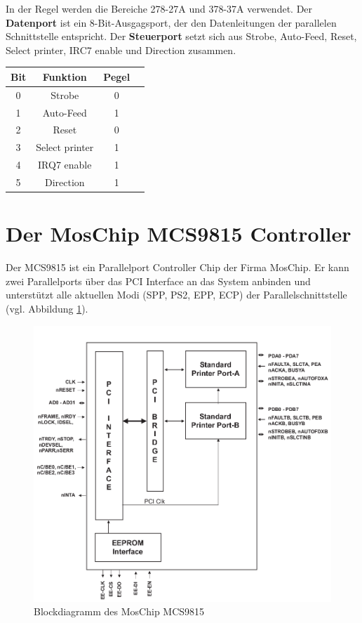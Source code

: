 \documentclass[a4paper,11pt]{article}
\begin{document}
In der Regel werden die Bereiche 278-27A und 378-37A verwendet. Der \textbf{Datenport} ist ein 8-Bit-Ausgagsport, der den Datenleitungen der parallelen Schnittstelle entspricht.  Der \textbf{Steuerport} setzt sich aus  Strobe, Auto-Feed, Reset, Select printer, IRC7 enable und Direction zusammen. 
 \begin{tabular}{|c|c|c|c|}
  \hline
Bit	&	Funktion		&	Pegel  \\ \hline
0	&	Strobe		&	0 \\ \hline
1	&	Auto-Feed		&	1\\ \hline
2	&	Reset		&	0\\ \hline
3	&	Select printer	&	1\\ \hline
4	&	IRQ7 enable	&	1\\ \hline
5	&	Direction	&	1\\ \hline
 \end{tabular} 

\section{Der MosChip MCS9815 Controller}

Der MCS9815 ist ein Parallelport Controller Chip der Firma MosChip. Er kann
zwei Parallelports über das PCI Interface an das System anbinden und unterstützt alle
aktuellen Modi (SPP, PS2, EPP, ECP) der Parallelschnittstelle (vgl. Abbildung \ref{fig:blockdiagramm_mcs9815}).

\begin{figure}[h!]
 \centering
 \includegraphics[bb=0 0 724 671,scale=0.5]{./pics/mcs9815_block_diagram.png}
 \caption{Blockdiagramm des MosChip MCS9815}
 \label{fig:blockdiagramm_mcs9815}
\end{figure}
\end{document}
